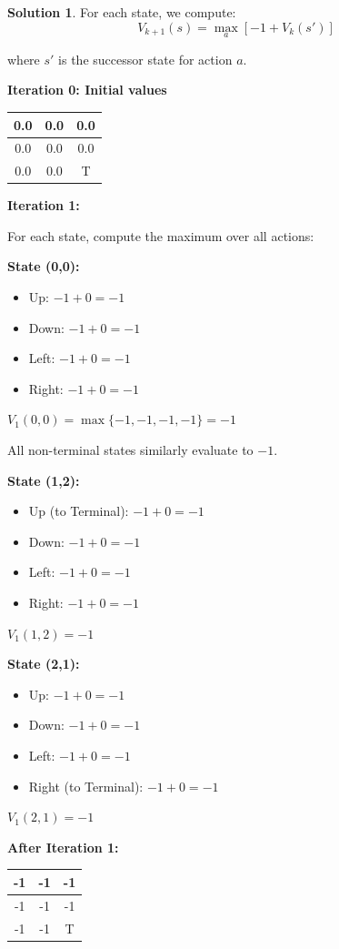 \documentclass[11pt]{article}
\theoremstyle{definition}
\newtheorem*{solution}{Solution}
\begin{document}
\begin{solution}
For each state, we compute:
\[
V_{k+1}(s) = \max_a \left[ -1 + V_k(s') \right]
\]

where $s'$ is the successor state for action $a$.

\textbf{Iteration 0: Initial values}

\begin{center}
\begin{tabular}{|c|c|c|}
\hline
0.0 & 0.0 & 0.0 \\
\hline
0.0 & 0.0 & 0.0 \\
\hline
0.0 & 0.0 & T \\
\hline
\end{tabular}
\end{center}

\textbf{Iteration 1:}

For each state, compute the maximum over all actions:

\textbf{State (0,0):}
\begin{itemize}
    \item Up: $-1 + 0 = -1$
    \item Down: $-1 + 0 = -1$
    \item Left: $-1 + 0 = -1$
    \item Right: $-1 + 0 = -1$
\end{itemize}
$V_1(0,0) = \max\{-1, -1, -1, -1\} = -1$

All non-terminal states similarly evaluate to $-1$.

\textbf{State (1,2):}
\begin{itemize}
    \item Up (to Terminal): $-1 + 0 = -1$
    \item Down: $-1 + 0 = -1$
    \item Left: $-1 + 0 = -1$
    \item Right: $-1 + 0 = -1$
\end{itemize}
$V_1(1,2) = -1$

\textbf{State (2,1):}
\begin{itemize}
    \item Up: $-1 + 0 = -1$
    \item Down: $-1 + 0 = -1$
    \item Left: $-1 + 0 = -1$
    \item Right (to Terminal): $-1 + 0 = -1$
\end{itemize}
$V_1(2,1) = -1$

\begin{center}
\textbf{After Iteration 1:}
\begin{tabular}{|c|c|c|}
\hline
-1 & -1 & -1 \\
\hline
-1 & -1 & -1 \\
\hline
-1 & -1 & T \\
\hline
\end{tabular}
\end{center}


\end{solution}
\end{document}
